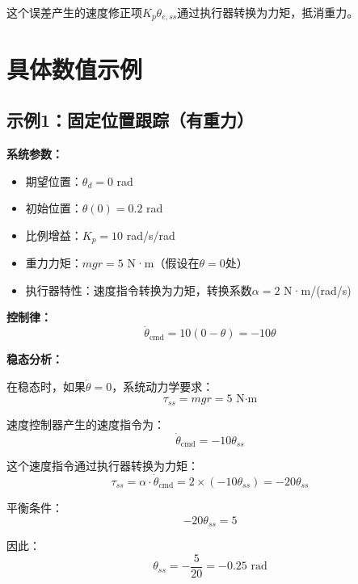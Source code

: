 \documentclass[12pt,a4paper]{article}
\begin{document}
这个误差产生的速度修正项$K_p \theta_{e,ss}$通过执行器转换为力矩，抵消重力。

\section{具体数值示例}

\subsection{示例1：固定位置跟踪（有重力）}

\textbf{系统参数：}
\begin{itemize}
\item 期望位置：$\theta_d = 0$ rad
\item 初始位置：$\theta(0) = 0.2$ rad
\item 比例增益：$K_p = 10$ rad/s/rad
\item 重力力矩：$mgr = 5$ N·m（假设在$\theta = 0$处）
\item 执行器特性：速度指令转换为力矩，转换系数$\alpha = 2$ N·m/(rad/s)
\end{itemize}

\textbf{控制律：}
\begin{equation}
\dot{\theta}_{\text{cmd}} = 10(0 - \theta) = -10\theta
\end{equation}

\textbf{稳态分析：}

在稳态时，如果$\dot{\theta} = 0$，系统动力学要求：
\begin{equation}
\tau_{ss} = mgr = 5 \text{ N·m}
\end{equation}

速度控制器产生的速度指令为：
\begin{equation}
\dot{\theta}_{\text{cmd}} = -10 \theta_{ss}
\end{equation}

这个速度指令通过执行器转换为力矩：
\begin{equation}
\tau_{ss} = \alpha \cdot \dot{\theta}_{\text{cmd}} = 2 \times (-10 \theta_{ss}) = -20 \theta_{ss}
\end{equation}

平衡条件：
\begin{equation}
-20 \theta_{ss} = 5
\end{equation}

因此：
\begin{equation}
\theta_{ss} = -\frac{5}{20} = -0.25 \text{ rad}
\end{equation}
\end{document}
